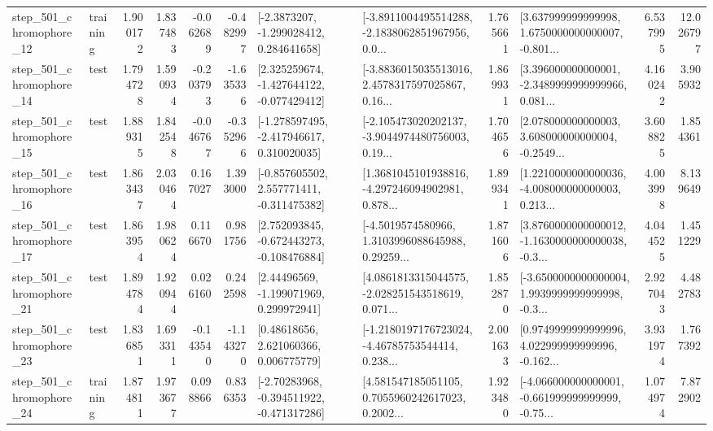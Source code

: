 \begin{tabular}{llrrrrllrlrr}
  step\_501\_chromophore\_12 &  training &      1.900172 &    1.837483 &     -0.062689 & -0.482997 &     [-2.3873207, -1.299028412, 0.284641658] &  [-3.8911004495514288, -2.1838062851967956, 0.0... &       1.765661 &  [3.637999999999998, 1.6750000000000007, -0.801... &            6.537995 &         12.026797 \\
  step\_501\_chromophore\_14 &      test &      1.794728 &    1.590934 &     -0.203793 & -1.635336 &   [2.325259674, -1.427644122, -0.077429412] &  [-3.8836015035513016, 2.4578317597025867, 0.16... &       1.869931 &  [3.396000000000001, -2.3489999999999966, 0.081... &            4.160242 &          3.905932 \\
  step\_501\_chromophore\_15 &      test &      1.889315 &    1.842548 &     -0.046767 & -0.352966 &   [-1.278597495, -2.417946617, 0.310020035] &  [-2.105473020202137, -3.9044974480756003, 0.19... &       1.704656 &  [2.078000000000003, 3.608000000000004, -0.2549... &            3.608825 &          1.854361 \\
  step\_501\_chromophore\_16 &      test &      1.863437 &    2.030464 &      0.167027 &  1.393000 &   [-0.857605502, 2.557771411, -0.311475382] &  [1.3681045101938816, -4.297246094902981, 0.878... &       1.899341 &  [1.2210000000000036, -4.008000000000003, 0.213... &            4.003998 &          8.139649 \\
  step\_501\_chromophore\_17 &      test &      1.863954 &    1.980624 &      0.116670 &  0.981756 &   [2.752093845, -0.672443273, -0.108476884] &  [-4.5019574580966, 1.3103996088645988, 0.29259... &       1.871606 &  [3.8760000000000012, -1.1630000000000038, -0.3... &            4.044525 &          1.451229 \\
  step\_501\_chromophore\_21 &      test &      1.894784 &    1.920944 &      0.026160 &  0.242598 &     [2.44496569, -1.199071969, 0.299972941] &  [4.0861813315044575, -2.028251543518619, 0.071... &       1.852870 &  [-3.6500000000000004, 1.9939999999999998, -0.3... &            2.927043 &          4.482783 \\
  step\_501\_chromophore\_23 &      test &      1.836851 &    1.693311 &     -0.143540 & -1.143270 &      [0.48618656, 2.621060366, 0.006775779] &  [-1.2180197176723024, -4.46785753544414, 0.238... &       2.001633 &  [0.9749999999999996, 4.022999999999996, -0.162... &            3.931974 &          1.767392 \\
  step\_501\_chromophore\_24 &  training &      1.874811 &    1.973677 &      0.098866 &  0.836353 &   [-2.70283968, -0.394511922, -0.471317286] &  [4.581547185051105, 0.7055960242617023, 0.2002... &       1.923480 &  [-4.066000000000001, -0.661999999999999, -0.75... &            1.074974 &          7.872902 \\

\end{tabular}
